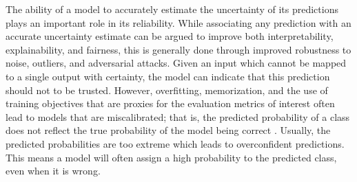 The ability of a model to accurately estimate the uncertainty of its predictions plays an important role in its reliability. While associating any prediction with an accurate uncertainty estimate can be argued to improve both interpretability, explainability, and fairness, this is generally done through improved robustness to noise, outliers, and adversarial attacks.
Given an input which cannot be mapped to a single output with certainty, the model can indicate that this prediction should not to be trusted. 
However, overfitting, memorization, and the use of training objectives that are proxies for the evaluation metrics of interest often lead to models that are miscalibrated; that is, the predicted probability of a class does not reflect the true probability of the model being correct \parencite{guo_calibration_2017, kull_temperature_2019}. 
Usually, the predicted probabilities are too extreme which leads to overconfident predictions. This means a model will often assign a high probability to the predicted class, even when it is wrong. 



